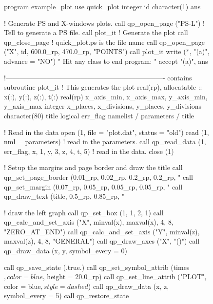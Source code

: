 \begin{figure}
\footnotesize
\begin{listing}{1}
  program example_plot
    use quick_plot
    integer id
    character(1) ans
  
    ! Generate PS and X-windows plots.
    call qp_open_page ("PS-L")  ! Tell \quickplot to generate a PS file.
    call plot_it              ! Generate the plot
    call qp_close_page        ! quick_plot.ps is the file name
    call qp_open_page ("X", id, 600.0_rp, 470.0_rp, "POINTS")
    call plot_it
    write (*, "(a)", advance = "NO") " Hit any class to end program: "
    accept "(a)", ans

  !----------------------------------------------------------------------
  contains
  subroutine plot_it                             ! This generates the plot
    real(rp), allocatable :: x(:), y(:), z(:), t(:)
    real(rp) x_axis_min, x_axis_max, y_axis_min, y_axis_max
    integer x_places, x_divisions, y_places, y_divisions
    character(80) title
    logical err_flag
    namelist / parameters / title

    ! Read in the data
    open (1, file = "plot.dat", status = "old")
    read (1, nml = parameters)                  ! read in the parameters.
    call qp_read_data (1, err_flag, x, 1, y, 3, z, 4, t, 5) ! read in the data.
    close (1)

    ! Setup the margins and page border and draw the title
    call qp_set_page_border (0.01_rp, 0.02_rp, 0.2_rp, 0.2_rp, "%
    call qp_set_margin (0.07_rp, 0.05_rp, 0.05_rp, 0.05_rp, "%
    call qp_draw_text (title, 0.5_rp, 0.85_rp, "%

    ! draw the left graph
    call qp_set_box (1, 1, 2, 1)
    call qp_calc_and_set_axis ("X", minval(x), maxval(x), 4, 8, "ZERO_AT_END")
    call qp_calc_and_set_axis ("Y", minval(z), maxval(z), 4, 8, "GENERAL")
    call qp_draw_axes ("X\dlab\u", "\gb(\A)")
    call qp_draw_data (x, y, symbol_every = 0)

    call qp_save_state (.true.)
    call qp_set_symbol_attrib (times$, color = blue$, height = 20.0_rp)
    call qp_set_line_attrib ("PLOT", color = blue$, style = dashed$)
    call qp_draw_data (x, z, symbol_every = 5)
    call qp_restore_state


\end{listing}
\end{figure}
